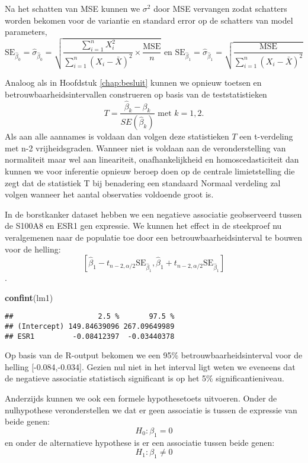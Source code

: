 \documentclass[12pt,dutch,coursenotes]{book}
\newenvironment{Shaded}{\begin{snugshade}}{\end{snugshade}}
\newcommand{\KeywordTok}[1]{\textcolor[rgb]{0.13,0.29,0.53}{\textbf{#1}}}
\newcommand{\NormalTok}[1]{#1}
\theoremstyle{definition}
\theoremstyle{definition}
\theoremstyle{definition}
\theoremstyle{remark}
\begin{document}
Na het schatten van MSE kunnen we \(\sigma^2\) door MSE vervangen zodat
schatters worden bekomen voor de variantie en standard error op de
schatters van model parameters,
\[\text{SE}_{\hat{\beta}_0}=\hat\sigma_{\hat{\beta}_0}=\sqrt{\frac{\sum\limits_{i=1}^n X^2_i}{\sum\limits_{i=1}^n (X_i-\bar X)^2} \times\frac{\text{MSE}}{n}} \text{ en } \text{SE}_{\hat{\beta}_1}=\hat\sigma_{\hat{\beta}_1}=\sqrt{\frac{\text{MSE}}{\sum\limits_{i=1}^n (X_i-\bar X)^2}}\]

Analoog als in Hoofdstuk \ref{chap:besluit} kunnen we opnieuw toetsen en
betrouwbaarheidsintervallen construeren op basis van de
teststatistieken\\
\[T=\frac{\hat{\beta}_k-\beta_k}{SE(\hat{\beta}_k)} \text{ met } k=1,2.\]
Als aan alle aannames is voldaan dan volgen deze statistieken \(T\) een
t-verdeling met n-2 vrijheidsgraden. Wanneer niet is voldaan aan de
veronderstelling van normaliteit maar wel aan lineariteit,
onafhankelijkheid en homoscedasticiteit dan kunnen we voor inferentie
opnieuw beroep doen op de centrale limietstelling die zegt dat de
statistiek T bij benadering een standaard Normaal verdeling zal volgen
wanneer het aantal observaties voldoende groot is.

In de borstkanker dataset hebben we een negatieve associatie
geobserveerd tussen de S100A8 en ESR1 gen expressie. We kunnen het
effect in de steekproef nu veralgemenen naar de populatie toe door een
betrouwbaarheidsinterval te bouwen voor de helling:
\[[\hat\beta_1 - t_{n-2,\alpha/2} \text{SE}_{\hat\beta_1},\hat\beta_1 + t_{n-2,\alpha/2} \text{SE}_{\hat\beta_1}]\].

\begin{Shaded}
\begin{Highlighting}[]
\KeywordTok{confint}\NormalTok{(lm1)}
\end{Highlighting}
\end{Shaded}

\begin{verbatim}
##                    2.5 %       97.5 %
## (Intercept) 149.84639096 267.09649989
## ESR1         -0.08412397  -0.03440378
\end{verbatim}

Op basis van de R-output bekomen we een 95\% betrouwbaarheidsinterval
voor de helling {[}-0.084,-0.034{]}. Gezien nul niet in het interval
ligt weten we eveneens dat de negatieve associatie statistisch
significant is op het 5\% significantieniveau.

Anderzijds kunnen we ook een formele hypothesetoets uitvoeren. Onder de
nulhypothese veronderstellen we dat er geen associatie is tussen de
expressie van beide genen: \[H_0: \beta_1=0\] en onder de alternatieve
hypothese is er een associatie tussen beide genen: \[H_1: \beta_1\neq0\]
\end{document}
